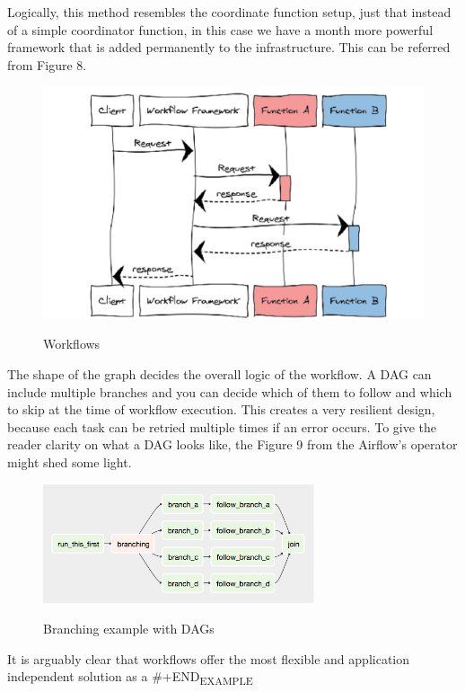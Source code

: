 \documentclass[12pt,titlepage]{article}
\begin{document}
Logically, this method resembles the coordinate function setup, just that
instead of a simple coordinator function, in this case we have a month more
powerful framework that is added permanently to the infrastructure. This can be
referred from Figure 8. 

\begin{figure}
\caption{Workflows}
\centering
\includegraphics[width=150mm]{./thesis_images/workflow_2.png}
\label{fig:Workflows}
\end{figure}

The shape of the graph decides the overall logic of the workflow. A DAG can
include multiple branches and you can decide which of them to follow and which
to skip at the time of workflow execution. This creates a very resilient design,
because each task can be retried multiple times if an error occurs. To give the
reader clarity on what a DAG looks like, the Figure 9 from the Airflow's
operator might shed some light.

\begin{figure}
\caption{Branching example with DAGs}
\centering
\includegraphics[width=80mm]{./thesis_images/workflow_1.png}
\label{fig:DAG}
\end{figure}







It is arguably clear that workflows offer the most flexible and application
independent solution as a 
\#+END\textsubscript{EXAMPLE}
\end{document}
